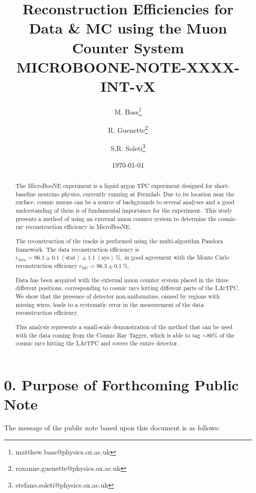 \documentclass[a4paper]{scrartcl}
\title{Reconstruction Efficiencies for Data \& MC using the Muon Counter System \\ \vspace{1em} \small{\textbf{MICROBOONE-NOTE-XXXX-INT-vX}}}
\author[1]{M. Bass\thanks{matthew.bass@physics.ox.ac.uk}}
\author[1]{R. Guenette\thanks{roxanne.guenette@physics.ox.ac.uk}}
\author[1]{S.R. Soleti\thanks{stefano.soleti@physics.ox.ac.uk}}
\affil[1]{\emph{\small{University of Oxford, Oxford OX1 3RH, United Kingdom}}}
\date{\today}
\begin{document}
\maketitle
\begin{abstract}
  The MicroBooNE experiment is a liquid argon TPC experiment designed for short-baseline neutrino physics, currently running at Fermilab. Due to its location near the surface, cosmic muons can be a source of backgrounds to several analyses and a good understanding of them is of fundamental importance for the experiment. This study presents a method of using an external muon counter system to determine the cosmic-ray reconstruction efficiency in MicroBooNE.

  The reconstruction of the tracks is performed using the multi-algorithm Pandora framework. The data reconstruction efficiency is $\epsilon_{\mathrm{data}}=96.1\pm0.1~(\mathrm{stat}) \pm 1.1~(\mathrm{sys})~\%$, in good agreement with the Monte Carlo reconstruction efficiency $\epsilon_{\mathrm{MC}} = 96.3\pm0.1~\%$.

  Data has been acquired with the external muon counter system placed in the three different positions, corresponding to cosmic rays hitting different parts of the LArTPC. We show that the presence of detector non-uniformities, caused by regions with missing wires, leads to a systematic error in the measurement of the data reconstruction efficiency.

  This analysis represents a small-scale demonstration of the method that can be used with the data coming from the Cosmic Ray Tagger, which is able to tag $\sim80\%$ of the cosmic rays hitting the LArTPC and covers the entire detector.
\end{abstract}

\tableofcontents

\clearpage{}

\section*{0. Purpose of Forthcoming Public Note}

The message of the public note based upon this document is as follows:
\end{document}
